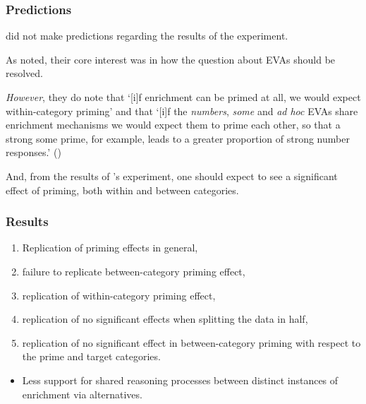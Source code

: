 \documentclass[noamssymb]{beamer}
\newcommand{\hand}{\ding{43}}
\begin{document}
\begin{frame}
\frametitle{{\ftf Predictions}}

\citeauthor{Bott:2016aa} did not make predictions regarding the results of the experiment.

As noted, their core interest was in how the question about EVAs should be resolved.

\emph{However}, they do note that `[i]f enrichment can be primed at all, we would expect within-category priming' and that `[i]f the \emph{numbers}, \emph{some} and \emph{ad hoc} EVAs share enrichment mechanisms we would expect them to prime each other, so that a strong some prime, for example, leads to a greater proportion of strong number responses.'
(\citeyear[122]{Bott:2016aa})

And, from the results of \citeauthor{Bott:2016aa}'s experiment, one should expect to see a significant effect of priming, both within and between categories.
\end{frame}

\begin{frame}
  \frametitle{{\ftf Results}}
  \begin{enumerate}[label=\arabic*.]
  \item Replication of priming effects in general,
  \item failure to replicate between-category priming effect,
  \item replication of within-category priming effect,
  \item replication of no significant effects when splitting the data in half,
  \item replication of no significant effect in between-category priming with respect to the prime and target categories.
  \end{enumerate}

  \begin{itemize}
  \item[\hand] Less support for shared reasoning processes between distinct instances of enrichment via alternatives.
  \end{itemize}

\end{frame}
\end{document}
